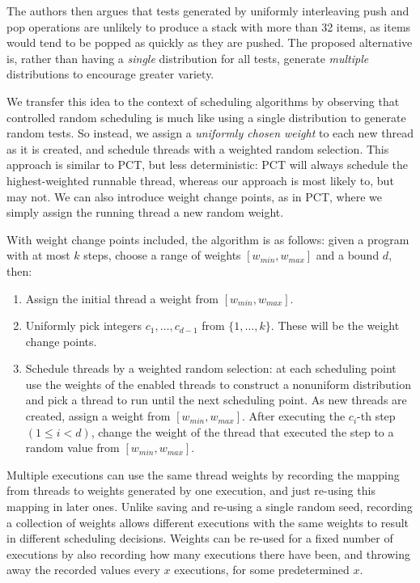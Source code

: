 The authors then argues that tests generated by uniformly interleaving
push and pop operations are unlikely to produce a stack with more than
32 items, as items would tend to be popped as quickly as they are
pushed.  The proposed alternative is, rather than having a
\emph{single} distribution for all tests, generate \emph{multiple}
distributions to encourage greater variety.

We transfer this idea to the context of scheduling algorithms by
observing that controlled random scheduling is much like using a
single distribution to generate random tests.  So instead, we assign a
\emph{uniformly chosen weight} to each new thread as it is created,
and schedule threads with a weighted random selection.  This approach
is similar to PCT, but less deterministic: PCT will always schedule
the highest-weighted runnable thread, whereas our approach is most
likely to, but may not.  We can also introduce weight change points,
as in PCT, where we simply assign the running thread a new random
weight.

With weight change points included, the algorithm is as follows: given a program
with at most $k$ steps, choose a range of weights $[w_{min}, w_{max}]$ and
a bound $d$, then:

\begin{enumerate}
\item Assign the initial thread a weight from $[w_{min}, w_{max}]$.
\item Uniformly pick integers $c_1, \ldots, c_{d-1}$ from $\{1, \ldots, k\}$.
These will be the weight change points.
\item Schedule threads by a weighted random selection: at each scheduling point
use the weights of the enabled threads to construct a nonuniform distribution
and pick a thread to run until the next scheduling point.  As new threads are
created, assign a weight from $[w_{min}, w_{max}]$.  After executing
the $c_i$-th step $(1 \leq i < d)$, change the weight of the thread that
executed the step to a random value from $[w_{min}, w_{max}]$.
\end{enumerate}

Multiple executions can use the same thread weights by recording the
mapping from threads to weights generated by one execution, and just
re-using this mapping in later ones.  Unlike saving and re-using a
single random seed, recording a collection of weights allows different
executions with the same weights to result in different scheduling
decisions.  Weights can be re-used for a fixed number of executions by
also recording how many executions there have been, and throwing away
the recorded values every $x$ executions, for some predetermined $x$.

